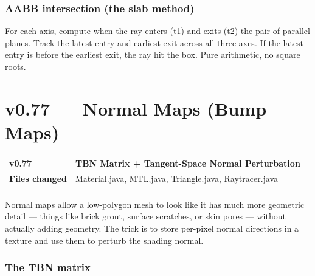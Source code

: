 \documentclass[
]{article}
\newcounter{none} %
\begin{document}
\subsubsection{\texorpdfstring{\textbf{AABB intersection (the slab
method)}}{AABB intersection (the slab method)}}\label{aabb-intersection-the-slab-method}

For each axis, compute when the ray enters (t1) and exits (t2) the pair
of parallel planes. Track the latest entry and earliest exit across all
three axes. If the latest entry is before the earliest exit, the ray hit
the box. Pure arithmetic, no square roots.

\section{\texorpdfstring{\textbf{v0.77 --- Normal Maps (Bump
Maps)}}{v0.77 --- Normal Maps (Bump Maps)}}\label{v0.77-normal-maps-bump-maps}

{\def\LTcaptype{none} %
\begin{longtable}[]{@{}
  >{\raggedright\arraybackslash}p{}
  >{\raggedright\arraybackslash}p{}@{}}
\toprule\noalign{}
\begin{minipage}[b]{\linewidth}\raggedright
\textbf{v0.77}
\end{minipage} & \begin{minipage}[b]{\linewidth}\raggedright
\textbf{TBN Matrix + Tangent-Space Normal Perturbation}
\end{minipage} \\
\begin{minipage}[b]{\linewidth}\raggedright
\textbf{Files changed}
\end{minipage} & \begin{minipage}[b]{\linewidth}\raggedright
Material.java, MTL.java, Triangle.java, Raytracer.java
\end{minipage} \\
\midrule\noalign{}
\endhead
\bottomrule\noalign{}
\endlastfoot
\end{longtable}
}

Normal maps allow a low-polygon mesh to look like it has much more
geometric detail --- things like brick grout, surface scratches, or skin
pores --- without actually adding geometry. The trick is to store
per-pixel normal directions in a texture and use them to perturb the
shading normal.

\subsubsection{\texorpdfstring{\textbf{The TBN
matrix}}{The TBN matrix}}\label{the-tbn-matrix}
\end{document}
